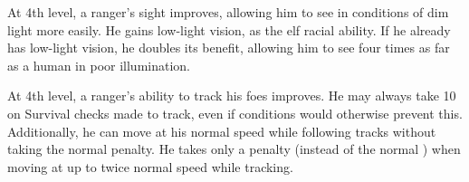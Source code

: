  At 4th level, a ranger's sight improves, allowing him to see in conditions of dim light more easily. He gains low-light vision, as the elf racial ability. If he already has low-light vision, he doubles its benefit, allowing him to see four times as far as a human in poor illumination.

 At 4th level, a ranger's ability to track his foes improves. He may always take 10 on Survival checks made to track, even if conditions would otherwise prevent this. Additionally, he can move at his normal speed while following tracks without taking the normal  penalty. He takes only a  penalty (instead of the normal ) when moving at up to twice normal speed while tracking.

\begin{comment}
\cf{Rgr}{Spells} Beginning at 4th level, a ranger gains the ability to cast a small number of divine spells, which are drawn from the ranger spell list (\pref{Ranger Spells}).

Rangers do not require verbal components to cast spells, even if the spell would normally require a verbal component. Rangers need only pay respect to nature to invoke their divine magic.

To learn or cast a spell, a ranger must have a Wisdom score at least equal to 10 \add the spell level (Wis 11 for 1st-level spells, Wis 12 for 2nd-level spells, and so forth). The Difficulty Class for a saving throw against a ranger's spell is 10 \add the spell level \add the ranger's Wisdom.

Like other spellcasters, a ranger can cast only a certain number of spells of each spell level per day. His base daily spell allotment is given on \trefnp{The Ranger}. In addition, he receives bonus spells per day if he has a high Wisdom score (see \trefcp{Attributes and Bonus Spells}).

 A ranger learns and casts spells the way a cleric does, though he does not have access to any domain spells or granted powers, as a cleric does, and cannot sacrifice a readied spell slot to cast a \spell{cure} spell in its place. A ranger may learn and cast any spell on the ranger spell list, provided that he can cast spells of that level.

A ranger's selection of spells is limited. He knows as many spells at each level as a paladin does, and can swap spells in the same way as the paladin.

\par Through 3rd level, a ranger has no caster level or magic level. At 4th level and higher, his caster level is equal to his ranger level / 2, and his magic level is equal to his ranger level.


\end{comment}
